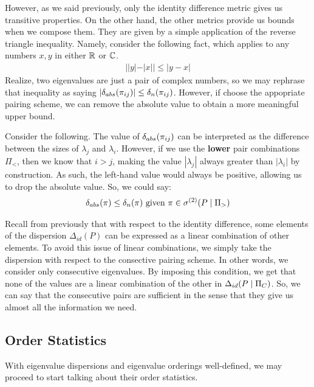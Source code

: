  However, as we said previously, only the identity difference metric gives us transitive properties.
On the other hand, the other metrics provide us bounds when we compose them.
They are given by a simple application of the reverse triangle inequality. Namely, consider the following fact, which applies to any numbers $x, y$ in either $\mathbb{R}$ or $\mathbb{C}$.
\begin{align*}
||y| - |x|| \leq |y - x|
\end{align*}
Realize, two eigenvalues are just a pair of complex numbers, so we may rephrase that inequality as saying $|\delta_{abs}(\pi_{ij})| \leq \delta_{n}(\pi_{ij})$.
However, if choose the appopriate pairing scheme, we can remove the absolute value to obtain a more meaningful upper bound. \newline

Consider the following. The value of $\delta_{abs}(\pi_{ij})$ can be interpreted as the difference between the sizes of $\lambda_j$ and $\lambda_i$.
However, if we use the \textbf{lower} pair combinations $\Pi_<$, then we know that $i > j$, making the value $|\lambda_j|$ always greater than $|\lambda_i|$ by construction.
As such, the left-hand value would always be positive, allowing us to drop the absolute value. So, we could say:
\begin{align*}
\delta_{abs}(\pi) \leq \delta_{n}(\pi) \text{ given } \pi \in {\sigma^{(2)}}(P \mid \Pi_>)
\end{align*}
\medskip

 Recall from previously that with respect to the identity difference, some elements of the dispersion $\Delta_{id}(P)$
can be expressed as a linear combination of other elements. To avoid this issue of linear combinations, we simply take the dispersion with respect to the consective pairing scheme. In other words,
we consider only consecutive eigenvalues.
By imposing this condition, we get that none of the values are a linear combination of the other in $\Delta_{id}(P \mid \Pi_C)$. So, we can say that the consecutive pairs are sufficient in the sense that
they give us almost all the information we need.

\subsection{Order Statistics}
With eigenvalue dispersions and eigenvalue orderings well-defined, we may proceed to start talking about their order statistics.

